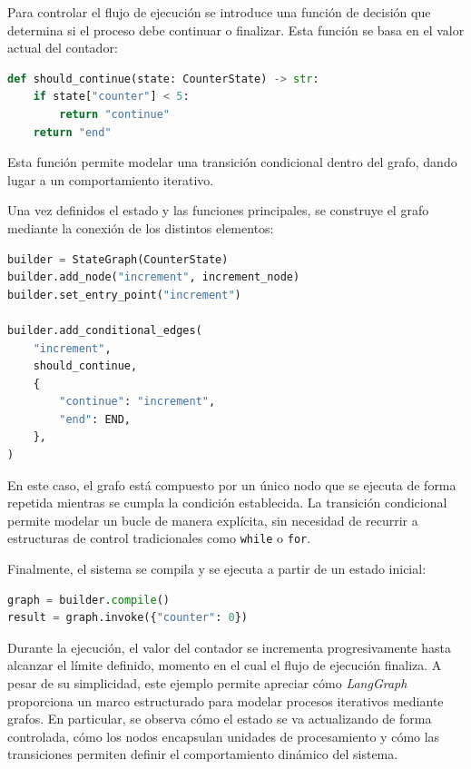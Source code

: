 \documentclass[12pt,a4paper,twoside,openright]{book}
\begin{document}
Para controlar el flujo de ejecución se introduce una función de decisión que determina si el proceso debe continuar o finalizar. Esta función se basa en el valor actual del contador:

\begin{lstlisting}[language=Python, caption={Condición de parada}]
def should_continue(state: CounterState) -> str:
    if state["counter"] < 5:
        return "continue"
    return "end"
\end{lstlisting}

Esta función permite modelar una transición condicional dentro del grafo, dando lugar a un comportamiento iterativo.

Una vez definidos el estado y las funciones principales, se construye el grafo mediante la conexión de los distintos elementos:

\begin{lstlisting}[language=Python, caption={Conexión de los elementos del grafo}]
builder = StateGraph(CounterState)
builder.add_node("increment", increment_node)
builder.set_entry_point("increment")

builder.add_conditional_edges(
    "increment",
    should_continue,
    {
        "continue": "increment",
        "end": END,
    },
)
\end{lstlisting}

En este caso, el grafo está compuesto por un único nodo que se ejecuta de forma repetida mientras se cumpla la condición establecida. La transición condicional permite modelar un bucle de manera explícita, sin necesidad
de recurrir a estructuras de control tradicionales como \texttt{while} o \texttt{for}.

Finalmente, el sistema se compila y se ejecuta a partir de un estado inicial:

\begin{lstlisting}[language=Python, caption={Ejecución de estado inicial}]
graph = builder.compile()
result = graph.invoke({"counter": 0})
\end{lstlisting}

Durante la ejecución, el valor del contador se incrementa progresivamente hasta alcanzar el límite definido, momento en el cual el flujo de ejecución finaliza.
A pesar de su simplicidad, este ejemplo permite apreciar cómo \emph{LangGraph} proporciona un marco estructurado para modelar procesos iterativos mediante grafos. En particular, se observa cómo el estado se va
actualizando de forma controlada, cómo los nodos encapsulan unidades de procesamiento y cómo las transiciones permiten definir el comportamiento dinámico del sistema.
\end{document}
